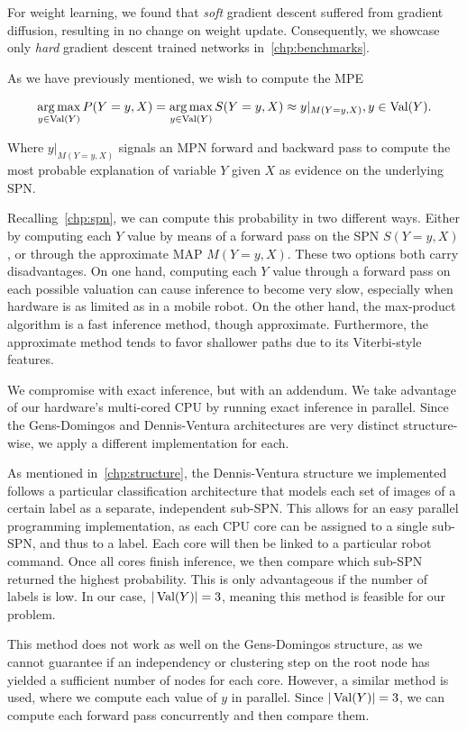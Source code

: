 For weight learning, we found that \textit{soft} gradient descent suffered from gradient diffusion,
resulting in no change on weight update. Consequently, we showcase only \textit{hard} gradient
descent trained networks in~\autoref{chp:benchmarks}.

As we have previously mentioned, we wish to compute the MPE

\begin{equation}
  \operatorname*{arg\,max}_{y\in\operatorname*{\text{Val}}(Y)} P(Y=y,X)=\operatorname*{arg\,max}_{y\in\operatorname*{\text{Val}}(Y)}S(Y=y,X)\approx y|_{M(Y=y,X)}, y\in\operatorname*{\text{Val}}(Y).
\end{equation}

Where $y|_{M(Y=y,X)}$ signals an MPN forward and backward pass to compute the most probable
explanation of variable $Y$ given $X$ as evidence on the underlying SPN.

Recalling~\autoref{chp:spn}, we can compute this probability in two different ways. Either
by computing each $Y$ value by means of a forward pass on the SPN $S(Y=y,X)$, or through the
approximate MAP $M(Y=y,X)$. These two options both carry disadvantages. On one hand, computing each
$Y$ value through a forward pass on each possible valuation can cause inference to become very
slow, especially when hardware is as limited as in a mobile robot. On the other hand, the
max-product algorithm is a fast inference method, though approximate. Furthermore, the approximate
method tends to favor shallower paths due to its Viterbi-style features.

We compromise with exact inference, but with an addendum. We take advantage of our hardware's
multi-cored CPU by running exact inference in parallel. Since the Gens-Domingos and Dennis-Ventura
architectures are very distinct structure-wise, we apply a different implementation for each.

As mentioned in~\autoref{chp:structure}, the Dennis-Ventura structure we implemented follows a
particular classification architecture that models each set of images of a certain label as a
separate, independent sub-SPN. This allows for an easy parallel programming implementation, as each
CPU core can be assigned to a single sub-SPN, and thus to a label. Each core will then be linked to
a particular robot command. Once all cores finish inference, we then compare which sub-SPN returned
the highest probability. This is only advantageous if the number of labels is low. In our case,
$|\operatorname*{\text{Val}}(Y)|=3$, meaning this method is feasible for our problem.

This method does not work as well on the Gens-Domingos structure, as we cannot guarantee if
an independency or clustering step on the root node has yielded a sufficient number of nodes for
each core. However, a similar method is used, where we compute each value of $y$ in parallel. Since
$|\operatorname*{\text{Val}}(Y)|=3$, we can compute each forward pass concurrently and then compare them.

